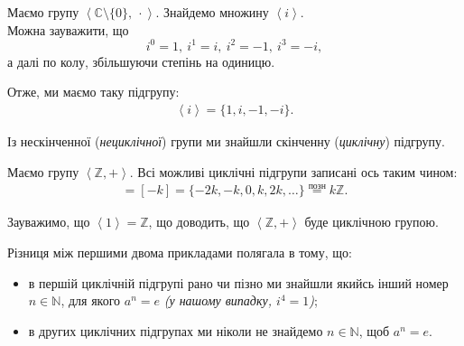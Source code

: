 \documentclass{math_library}
\begin{document}
\begin{example}
Маємо групу $\left<\mathbb{C} \setminus \{0\},\ \cdot \right>$. Знайдемо множину $\left<i\right>$.
\bigskip \\
Можна зауважити, що \[
i^0 = 1,\ i^1 = i,\ i^2 = -1,\ i^3 = -i,
\]
а далі по колу, збільшуючи степінь на одиницю.
\begin{figure}[H]
\centering
{}
\end{figure}
Отже, ми маємо таку підгрупу:
\begin{align*}
\left<i\right> = \{1,i,-1,-i\}.
\end{align*}
\end{example}

\begin{remark}
Із нескінченної (\textit{нециклічної}) групи ми знайшли скінченну (\textit{циклічну}) підгрупу.
\end{remark}

\begin{example}
Маємо групу $\left< \mathbb{Z}, + \right>$. Всі можливі циклічні підгрупи записані ось таким чином:
\begin{align*}
[k] = [-k] = \{-2k,-k,0,k,2k,\dots\} \overset{\text{позн}}{=} k\mathbb{Z}.
\end{align*}
\end{example}

\begin{example}
Зауважимо, що $\left<1\right> = \mathbb{Z}$, що доводить, що $\left< \mathbb{Z}, + \right>$ буде циклічною групою.
\end{example}

\begin{remark}
Різниця між першими двома прикладами полягала в тому, що:
\begin{itemize}[nosep]
\item в першій циклічній підгрупі рано чи пізно ми знайшли якийсь інший номер $n \in \mathbb{N}$, для якого $a^n = e$ \textit{(у нашому випадку, $i^4 = 1$)};
\item в других циклічних підгрупах ми ніколи не знайдемо $n \in \mathbb{N}$, щоб $a^n = e$.
\end{itemize}
\end{remark}
\end{document}
